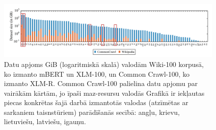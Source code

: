 \begin{figure}[h]
    \centering
    \includegraphics[width=\textwidth]{figures/dataset-size.png}
    \caption{Datu apjoms GiB (logaritmiskā skalā) valodām Wiki-100 korpusā, ko izmanto mBERT un XLM-100, un Common Crawl-100, ko izmanto XLM-R. Common Crawl-100 palielina datu apjomu par vairākām kārtām, jo īpaši maz-resursu valodās \cite{conneau2020} Grafikā ir iekļautas piecas konkrētas šajā darbā izmantotās valodas (atzīmētas ar sarkaniem taisnstūriem) parādīšanās secībā: angļu, krievu, lietuviešu, latviešu, igauņu.}
    \label{fig:dataset-size}
\end{figure}

